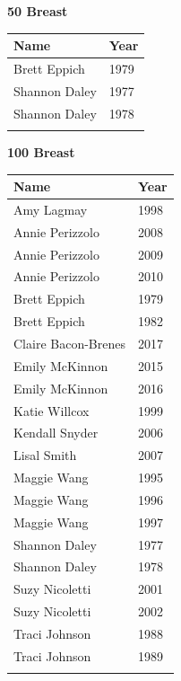 \vspace{1.2em}
\noindent\begin{minipage}[t]{0.48\textwidth}
\centering
\textbf{\textcolor{teamprimary}{50 Breast}}\par
\vspace{0.5em}
\centering
\small
\renewcommand{\arraystretch}{1.0}
\setlength{\tabcolsep}{4pt}
\begin{tabular}{@{}p{3.0cm}p{1.0cm}@{}}
\toprule
\textbf{Name} & \textbf{Year} \\
\midrule
Brett Eppich & 1979 \\
Shannon Daley & 1977 \\
Shannon Daley & 1978 \\
\bottomrule
\vspace{0.5em}
\end{tabular}
\end{minipage}
\hfill
\begin{minipage}[t]{0.48\textwidth}
\centering
\textbf{\textcolor{teamprimary}{100 Breast}}\par
\vspace{0.5em}
\centering
\small
\renewcommand{\arraystretch}{1.0}
\setlength{\tabcolsep}{4pt}
\begin{tabular}{@{}p{3.0cm}p{1.0cm}@{}}
\toprule
\textbf{Name} & \textbf{Year} \\
\midrule
Amy Lagmay & 1998 \\
Annie Perizzolo & 2008 \\
Annie Perizzolo & 2009 \\
Annie Perizzolo & 2010 \\
Brett Eppich & 1979 \\
Brett Eppich & 1982 \\
Claire Bacon-Brenes & 2017 \\
Emily McKinnon & 2015 \\
Emily McKinnon & 2016 \\
Katie Willcox & 1999 \\
Kendall Snyder & 2006 \\
Lisal Smith & 2007 \\
Maggie Wang & 1995 \\
Maggie Wang & 1996 \\
Maggie Wang & 1997 \\
Shannon Daley & 1977 \\
Shannon Daley & 1978 \\
Suzy Nicoletti & 2001 \\
Suzy Nicoletti & 2002 \\
Traci Johnson & 1988 \\
Traci Johnson & 1989 \\
\bottomrule
\vspace{0.5em}
\end{tabular}
\end{minipage}
